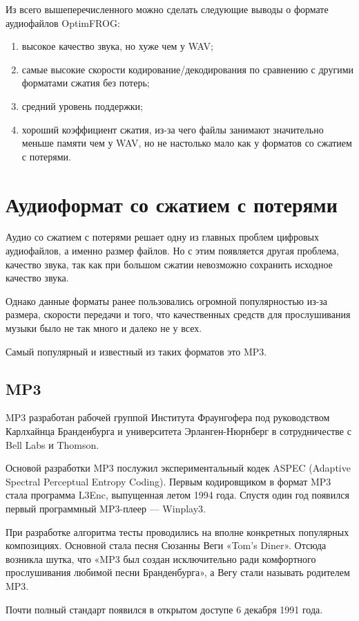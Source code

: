 \documentclass[12pt,a4paper,oneside]{report}
\begin{document}
Из всего вышеперечисленного можно сделать следующие выводы о формате аудиофайлов OptimFROG:
\begin{enumerate}
	\item высокое качество звука, но хуже чем у WAV;
	\item самые высокие скорости кодирование/декодирования по сравнению с другими форматами сжатия без потерь;
	\item средний уровень поддержки;
	\item хороший коэффициент сжатия, из-за чего файлы занимают значительно меньше памяти чем у WAV, но не настолько мало как у форматов со сжатием с потерями.
\end{enumerate}

\section{Аудиоформат со сжатием с потерями}
\quad
Аудио со сжатием с потерями решает одну из главных проблем цифровых аудиофайлов, а именно размер файлов. Но с этим появляется другая проблема, качество звука, так как при большом сжатии невозможно сохранить исходное качество звука.

Однако данные форматы ранее пользовались огромной популярностью из-за размера, скорости передачи и того, что качественных средств для прослушивания музыки было не так много и далеко не у всех.

Самый популярный и известный из таких форматов это MP3.
\subsection{MP3}
\quad
MP3 разработан рабочей группой Института Фраунгофера под руководством Карлхайнца Бранденбурга и университета Эрланген-Нюрнберг в сотрудничестве с Bell Labs и Thomson.

Основой разработки MP3 послужил экспериментальный кодек ASPEC (Adaptive Spectral Perceptual Entropy Coding). Первым кодировщиком в формат MP3 стала программа L3Enc, выпущенная летом 1994 года. Спустя один год появился первый программный MP3-плеер — Winplay3.

При разработке алгоритма тесты проводились на вполне конкретных популярных композициях. Основной стала песня Сюзанны Веги «Tom’s Diner». Отсюда возникла шутка, что «MP3 был создан исключительно ради комфортного прослушивания любимой песни Бранденбурга», а Вегу стали называть родителем MP3.

Почти полный стандарт появился в открытом доступе 6 декабря 1991 года.
\end{document}
